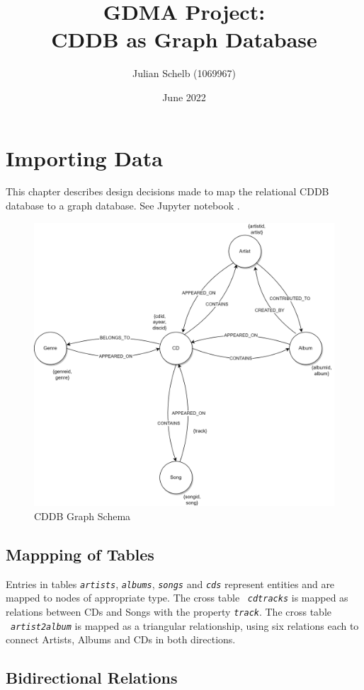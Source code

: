 \documentclass{article}
\title{GDMA Project: \\ CDDB as Graph Database}
\author{Julian Schelb (1069967)}
\date{June 2022}
\newcommand{\name}[1]{\texttt{\emph{#1}}}
\begin{document}
\maketitle

\section{Importing Data}

This chapter describes design decisions made to map the relational CDDB database to a graph database. See Jupyter notebook .

\begin{figure}[ht]
    \centering
    \includegraphics[width=11.5cm]{../Figures/cddb_as_graph-Default.png}
    \caption{CDDB Graph Schema }
\end{figure}

\subsection{Mappping of Tables}
Entries in tables \name{artists}, \name{albums}, \name{songs} and \name{cds} represent entities and are mapped to nodes of appropriate type. The cross table  \name{cdtracks} is mapped as relations between CDs and Songs with the property \name{track}. The cross table  \name{artist2album} is mapped as a triangular relationship, using six relations each to connect Artists, Albums and CDs in both directions.

\subsection{Bidirectional Relations}
\end{document}
